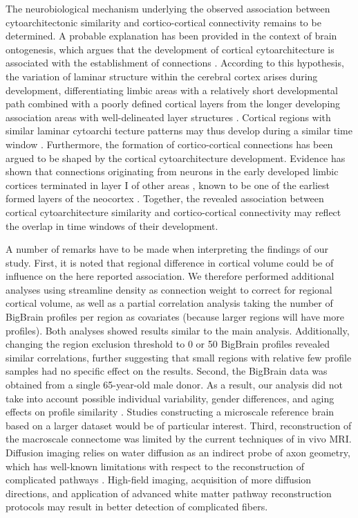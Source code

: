 \begin{refsection}
The neurobiological mechanism underlying the observed association between cytoarchitectonic similarity and cortico-cortical connectivity remains to be determined. A probable explanation has been provided in the context of brain ontogenesis, which argues that the development of cortical cytoarchitecture is associated with the establishment of connections \citep{barbas2015general,beul2017predictive,beul2015predictive,goulas2016cytoarchitectonic,goulas2017principles}. According to this hypothesis, the variation of laminar structure within the cerebral cortex arises during development, differentiating limbic areas with a relatively short developmental path combined with a poorly defined cortical layers from the longer developing association areas with well-delineated layer structures \citep{Barbas2016HowTP}. Cortical regions with similar laminar cytoarchi tecture patterns may thus develop during a similar time window \citep{barbas2015general,beul2017predictive,beul2015predictive,goulas2016cytoarchitectonic,goulas2017principles}. Furthermore, the formation of cortico-cortical connections has been argued to be shaped by the cortical cytoarchitecture development. Evidence has shown that connections originating from neurons in the early developed limbic cortices terminated in layer I of other areas \citep{barbas2015general}, known to be one of the earliest formed layers of the neocortex \citep{MarnPadilla1970PrenatalAE}. Together, the revealed association between cortical cytoarchitecture similarity and cortico-cortical connectivity may reflect the overlap in time windows of their development.

A number of remarks have to be made when interpreting the findings of our study. First, it is noted that regional difference in cortical volume could be of influence on the here reported association. We therefore performed additional analyses using streamline density as connection weight to correct for regional cortical volume, as well as a partial correlation analysis taking the number of BigBrain profiles per region as covariates (because larger regions will have more profiles). Both analyses showed results similar to the main analysis. Additionally, changing the region exclusion threshold to 0 or 50 BigBrain profiles revealed similar correlations, further suggesting that small regions with relative few profile samples had no specific effect on the results. Second, the BigBrain data was obtained from a single 65-year-old male donor. As a result, our analysis did not take into account possible individual variability, gender differences, and aging effects on profile similarity \citep{Shaw2008NeurodevelopmentalTO,Zilles1997QuantitativeAO}. Studies constructing a microscale reference brain based on a larger dataset would be of particular interest. Third, reconstruction of the macroscale connectome was limited by the current techniques of in vivo MRI. Diffusion imaging relies on water diffusion as an indirect probe of axon geometry, which has well-known limitations with respect to the reconstruction of complicated pathways \citep{Jbabdi2011TractographyWD}. High-field imaging, acquisition of more diffusion directions, and application of advanced white matter pathway reconstruction protocols may result in better detection of complicated fibers.


\end{refsection}
